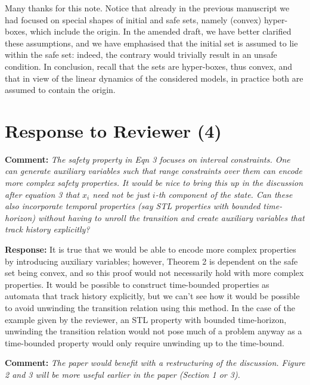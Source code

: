 \documentclass{article}
\begin{document}
Many thanks for this note. 
Notice that already in the previous manuscript we had focused on special shapes of initial and safe sets, namely (convex) hyper-boxes, which include the
origin. 
In the amended draft, we have better clarified these assumptions, and 
we have emphasised that the initial set is assumed to lie within the safe set: indeed, the contrary would trivially result in an unsafe condition. 
In conclusion, recall that the sets are hyper-boxes, thus convex, and that in view of the linear dynamics of the considered models, in practice both 
are assumed to contain the origin.   

\section{Response to Reviewer (4)}

{\bf Comment:  } {\itshape The safety property in Eqn 3 focuses on interval constraints. One can generate auxiliary variables such that range
constraints over them can encode
more complex safety properties. It would be nice to bring this up in the discussion after equation 3 that $x_i$ need not be just $i$-th component of
the
state.  Can these also incorporate temporal properties (say STL properties with bounded time-horizon) without having to unroll the transition and
create auxiliary variables that track history explicitly?}

\vspace{1em}
{\bf Response:}
 It is true that we would be able to encode more complex properties by introducing auxiliary variables; 
 however,  Theorem 2 is dependent on the safe set being convex, and so this proof would not necessarily hold with more complex properties. 
 It would be possible to construct time-bounded properties as automata that track history explicitly, but we can't see how
it would be possible to avoid unwinding the transition relation using this method. In the case of the example given by the reviewer, an STL property with bounded time-horizon, unwinding
the transition relation would not pose much of a problem anyway as a time-bounded property would only require unwinding up to the time-bound.


\vspace{2em}
{\bf Comment: } {\itshape The paper would benefit with a restructuring of the discussion. Figure 2 and 3 will be more useful
earlier in the paper (Section 1 or 3).}
\end{document}

